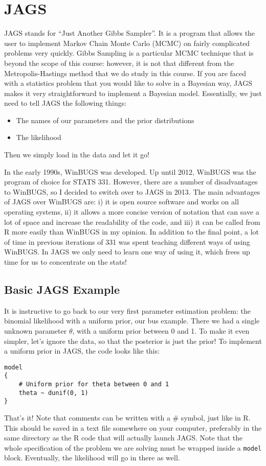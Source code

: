 \chapter{JAGS}
JAGS stands for ``Just Another Gibbs Sampler''. It is a program that allows the user
to implement Markov Chain Monte Carlo (MCMC) on fairly complicated problems
very quickly. Gibbs Sampling is a particular MCMC technique that is beyond the
scope of this course: however, it is not that different from the Metropolis-Hastings
method that we do study in this course. If you are faced with a statistics
problem that you would like to solve in a Bayesian way, JAGS makes it very
straightforward to implement a Bayesian model. Essentially, we just need to tell
JAGS the following things:
\begin{itemize}
\item The names of our parameters and the prior distributions
\item The likelihood
\end{itemize}
Then we simply load in the data and let it go!

In the early 1990s, WinBUGS was developed. Up until 2012, WinBUGS was the
program of choice for STATS 331. However, there are a number of disadvantages to
WinBUGS, so I decided to switch over to JAGS in 2013. The main advantages of
JAGS over WinBUGS are: i) it is open source software and works on all
operating systems, ii) it allows a more concise version of notation that can
save a lot of space and increase the readability of the code, and iii) it can
be called from R more easily than WinBUGS in my opinion. In addition to the
final point, a lot of time in previous iterations of 331 was spent teaching
different ways of using WinBUGS. In JAGS we only need to learn one way of using
it, which frees up time for us to concentrate on the stats!

\section{Basic JAGS Example}
It is instructive to go back to our very first parameter estimation problem:
the binomial likelihood with a uniform prior, our bus example. There we had a
single unknown parameter $\theta$, with a uniform prior between 0 and 1. To make
it even simpler, let's ignore the data, so that the posterior is just the prior!
To implement a uniform prior in JAGS, the code looks like this:
\begin{framed}
\begin{verbatim}
model
{
    # Uniform prior for theta between 0 and 1
    theta ~ dunif(0, 1)
}
\end{verbatim}
\end{framed}
That's it! Note that comments can be written with a \# symbol, just like in R.
This should be saved in a text file somewhere on your computer, preferably in
the same directory as the R code that will actually launch JAGS. Note that
the whole specification of the problem we are solving must be wrapped inside
a {\tt model {   }} block. Eventually, the likelihood will go in there as well.


